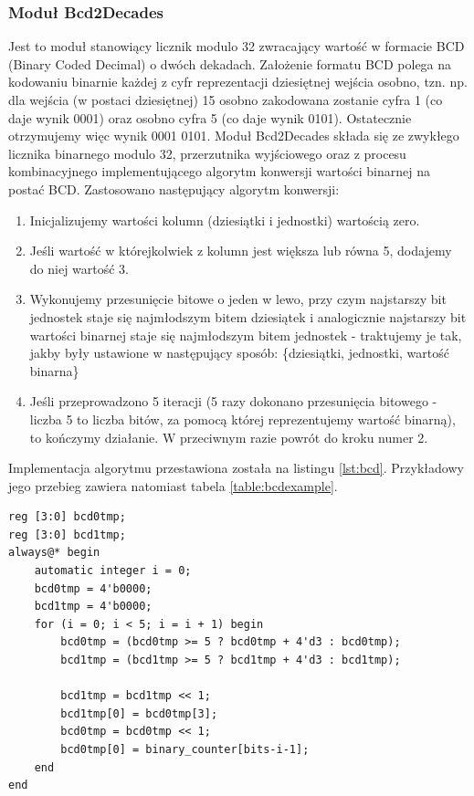 \documentclass[12pt] {article}
\begin{document}
\subsubsection{Moduł Bcd2Decades}
Jest to moduł stanowiący licznik modulo 32 zwracający wartość w formacie BCD (Binary Coded Decimal) o dwóch dekadach. Założenie formatu BCD polega na kodowaniu binarnie każdej z cyfr reprezentacji dziesiętnej wejścia osobno, tzn. np. dla wejścia (w postaci dziesiętnej) 15 osobno zakodowana zostanie cyfra 1 (co daje wynik 0001) oraz osobno cyfra 5 (co daje wynik 0101). Ostatecznie otrzymujemy więc wynik 0001 0101. Moduł Bcd2Decades składa się ze zwykłego licznika binarnego modulo 32, przerzutnika wyjściowego oraz z procesu kombinacyjnego implementującego algorytm konwersji wartości binarnej na postać BCD. Zastosowano następujący algorytm konwersji:
\begin{enumerate}
\item Inicjalizujemy wartości kolumn (dziesiątki i jednostki) wartością zero.
\item Jeśli wartość w którejkolwiek z kolumn jest większa lub równa 5, dodajemy do niej wartość 3.
\item Wykonujemy przesunięcie bitowe o jeden w lewo, przy czym najstarszy bit jednostek staje się najmłodszym bitem dziesiątek i analogicznie najstarszy bit wartości binarnej staje się najmłodszym bitem jednostek - traktujemy je tak, jakby były ustawione w następujący sposób: \{dziesiątki, jednostki, wartość binarna\}
\item Jeśli przeprowadzono 5 iteracji (5 razy dokonano przesunięcia bitowego - liczba 5 to liczba bitów, za pomocą której reprezentujemy wartość binarną), to kończymy działanie. W przeciwnym razie powrót do kroku numer 2. 
\end{enumerate}
Implementacja algorytmu przestawiona została na listingu \ref{lst:bcd}. Przykładowy jego przebieg zawiera natomiast tabela \ref{table:bcdexample}.
\begin{lstlisting}[style={verilog-style}, caption={Implementacja algorytmu zamiany wartości binarnej na postać BCD.}, label={lst:bcd}]
reg [3:0] bcd0tmp;
reg [3:0] bcd1tmp;
always@* begin
    automatic integer i = 0;
    bcd0tmp = 4'b0000;
    bcd1tmp = 4'b0000;
    for (i = 0; i < 5; i = i + 1) begin
        bcd0tmp = (bcd0tmp >= 5 ? bcd0tmp + 4'd3 : bcd0tmp);
        bcd1tmp = (bcd1tmp >= 5 ? bcd1tmp + 4'd3 : bcd1tmp);
            
        bcd1tmp = bcd1tmp << 1;
        bcd1tmp[0] = bcd0tmp[3];
        bcd0tmp = bcd0tmp << 1;
        bcd0tmp[0] = binary_counter[bits-i-1];
    end
end
\end{lstlisting}
\end{document}
